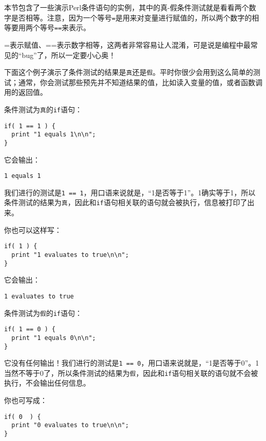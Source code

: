 本节包含了一些演示Perl条件语句的实例，其中的真-假条件测试就是看看两个数字是否相等。注意，因为一个等号\verb|=|是用来对变量进行赋值的，所以两个数字的相等要用两个等号\verb|==|来表示。

\begin{adjustwidth}{4em}{4em}
\noindent
=表示赋值、==表示数字相等，这两者非常容易让人混淆，可是说是编程中最常见的“bug”了，所以一定要小心奥！
\end{adjustwidth}

下面这个例子演示了条件测试的结果是\verb|真|还是\verb|假|。平时你很少会用到这么简单的测试；通常，你会测试那些预先并不知道结果的值，比如读入变量的值，或者函数调用的返回值。

条件测试为\verb|真|的\verb|if|语句：

\begin{lstlisting}
if( 1 == 1 ) {
  print "1 equals 1\n\n";
}
\end{lstlisting}

它会输出：

\begin{lstlisting}
1 equals 1
\end{lstlisting}

我们进行的测试是\verb|1 == 1|，用口语来说就是，“1是否等于1”。1确实等于1，所以条件测试的结果为\verb|真|，因此和\verb|if|语句相关联的语句就会被执行，信息被打印了出来。

你也可以这样写：

\begin{lstlisting}
if( 1 ) {
  print "1 evaluates to true\n\n";
}
\end{lstlisting}

它会输出：

\begin{lstlisting}
1 evaluates to true
\end{lstlisting}

条件测试为\verb|假|的\verb|if|语句：

\begin{lstlisting}
if( 1 == 0 ) {
  print "1 equals 0\n\n";
}
\end{lstlisting}

它没有任何输出！我们进行的测试是\verb|1 == 0|，用口语来说就是，“1是否等于0”。1当然不等于0了，所以条件测试的结果为\verb|假|，因此和\verb|if|语句相关联的语句就不会被执行，不会输出任何信息。

你也可写成：

\begin{lstlisting}
if( 0  ) {
  print "0 evaluates to true\n\n";
}
\end{lstlisting}


